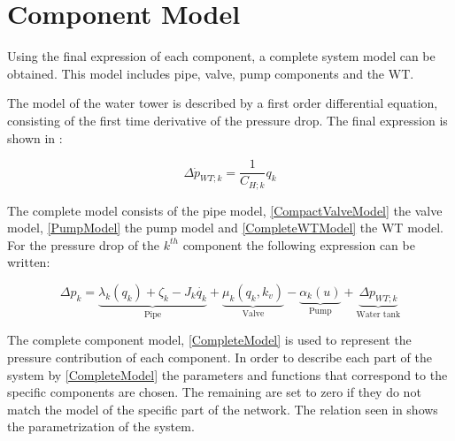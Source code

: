 \section{Component Model} 
\label{CompleteSystemModel}

Using the final expression of each component, a complete system model can be obtained. This model includes pipe, valve, pump components and the WT. 

The model of the water tower is described by a first order differential equation, consisting of the first time derivative of the pressure drop. The final expression is shown in :

\begin{equation}
  \label{CompleteWTModel}
  \Delta \dot{p}_{WT;k} = \frac{1}{C_{H;k}} q_k 
\end{equation}

The complete model consists of the pipe model, \eqref{CompactValveModel} the valve model, \eqref{PumpModel} the pump model and \eqref{CompleteWTModel} the WT model. For the pressure drop of the $k^{th}$ component the following expression can be written: 

%

\begin{equation}
\label{CompleteModel}
\Delta p_k = \underbrace{\lambda_k (q_k) + \zeta_k - J_k \dot{q_k}}_\text{Pipe} + \underbrace{\mu_k (q_k, k_v)}_\text{Valve} - \underbrace{\alpha_k(u)}_\text{Pump} + \underbrace{\Delta p_{WT;k}}_\text{Water tank}
\end{equation}

The complete component model, \eqref{CompleteModel} is used to represent the pressure contribution of each component. In order to describe each part of the system by \eqref{CompleteModel} the parameters and functions that correspond to the specific components are chosen. The remaining are set to zero if they do not match the model of the specific part of the network. 
The relation seen in  shows the parametrization of the system.

